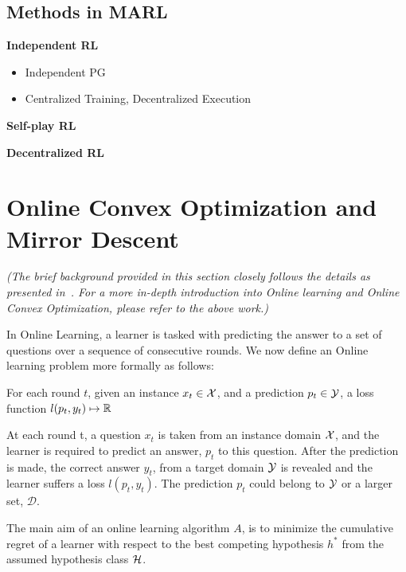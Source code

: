 \subsection{Methods in MARL}
\textbf{Independent RL}
\begin{itemize}
	\item {Independent PG}
	      \item{Centralized Training, Decentralized Execution}
\end{itemize}

\textbf{Self-play RL}

\textbf{Decentralized RL}

\section{Online Convex Optimization and Mirror Descent}
\textit{(The brief background provided in this section closely follows the details as presented
	in~\cite{shalev-shwartzOnline2012}.
	For a more in-depth introduction into Online learning and Online Convex Optimization, please refer
	to the above work.)
}

In Online Learning, a learner is tasked with predicting the answer to a set of questions over a
sequence of consecutive rounds.
We now define an Online learning problem more formally as follows:

\begin{definition}
	\label{def:olearning} For each round $t$, given an instance $x_t \in \mathcal{X}$, and
	a prediction $p_t \in \mathcal{Y}$, a loss function $l(p_t, y_t) \mapsto \mathbb{R}$
\end{definition}

At each round t, a question $x_t$ is taken from an instance domain $\mathcal{X}$, and
the learner is required to predict an answer, $p_t$ to this question.
After the prediction is made, the correct answer $y_t$, from a target domain $\mathcal{Y}$ is revealed
and the learner suffers a loss $l(p_t, y_t)$.
The prediction $p_t$ could belong to $\mathcal{Y}$ or a larger set, $\mathcal{D}$.


The main aim of an online learning algorithm $A$, is to minimize the cumulative regret of a learner
with respect to the best competing hypothesis $h^*$ from the assumed hypothesis class $\mathcal{H}$.


